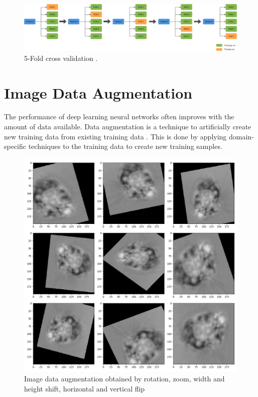 \begin{figure}[h]
	\centering
	\includegraphics[width=\textwidth]{Figs/kfold.png}
    \caption{5-Fold cross validation \citep{k-fold}.}
    \label{kfold}
\end{figure}


\section{Image Data Augmentation}
\label{backgournd_aug}

The performance of deep learning neural networks often improves with the amount of data available. Data augmentation is a technique to artificially create new training data from existing training data \citep{Mikolajczyk2018}. This is done by applying domain-specific techniques to the training data to create new training samples.

\begin{figure}[h]
	\centering
	\includegraphics[width=\textwidth]{Figs/dataaug.jpg}
    \caption{Image data augmentation obtained by rotation, zoom, width and height shift, horizontal and vertical flip}
    \label{dataaug}
\end{figure}

